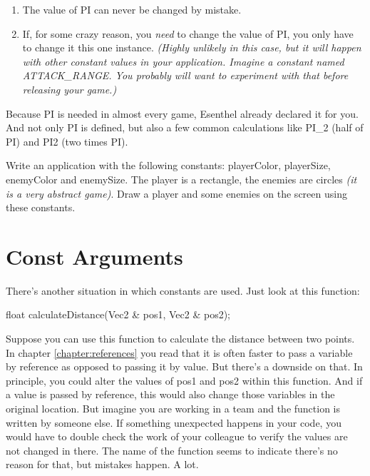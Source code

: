 \begin{enumerate}
	\item The value of PI can never be changed by mistake.
	\item If, for some crazy reason, you \textit{need} to change the value of PI, you only have to change it this one instance. \textsl{(Highly unlikely in this case, but it will happen with other constant values in your application. Imagine a constant named ATTACK\_RANGE. You probably will want to experiment with that before releasing your game.)} 
\end{enumerate}

\begin{note}
Because PI is needed in almost every game, Esenthel already declared it for you. And not only PI is defined, but also a few common calculations like PI\_2 (half of PI) and PI2 (two times PI).
\end{note}

\begin{exercise}
Write an application with the following constants: playerColor, playerSize, enemyColor and enemySize. The player is a rectangle, the enemies are circles \textit{(it is a very abstract game)}. Draw a player and some enemies on the screen using these constants. 
\end{exercise}

\section{Const Arguments}
There's another situation in which constants are used. Just look at this function:

\begin{code}
float calculateDistance(Vec2 & pos1, Vec2 & pos2);
\end{code}

Suppose you can use this function to calculate the distance between two points. In chapter \ref{chapter:references} you read that it is often faster to pass a variable by reference as opposed to passing it by value. But there's a downside on that. In principle, you could alter the values of pos1 and pos2 within this function. And if a value is passed by reference, this would also change those variables in the original location. But imagine you are working in a team and the function  is written by someone else. If something unexpected happens in your code, you would have to double check the work of your colleague to verify the values are not changed in there. The name of the function seems to indicate there's no reason for that, but mistakes happen. A lot.

